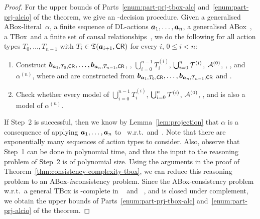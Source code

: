 \begin{proof}
        For the upper bounds of Parts~\ref{enum:part-prj-tbox-alc}
        and~\ref{enum:part-prj-alcio} of the theorem, we give an
        \ExpTime-decision procedure.  Given a generalised ABox-literal~$\alpha$,
        a finite sequence of DL-actions $\boldsymbol a_1,\dots,\boldsymbol a_n$, a generalised
        ABox~\Amc, a TBox~\Tmc and a finite set of causal relationships~\CR, we
        do the following for all action types $T_0,\dots,T_{n-1}$ with
        $T_i\in\mathfrak{T}(\boldsymbol a_{i+1},\mathsf{CR})$ for every $i$, $0\le i<n$:
        \begin{enumerate}
            \item Construct
                $\boldsymbol b_{\boldsymbol a_1,T_0,\mathsf{CR}},\dots,\boldsymbol b_{\boldsymbol a_n,T_{n-1},\mathsf{CR}}$, \Rmc,
                $\bigcup_{i=0}^{n-1}T_i^{(i)}$, $\bigcup_{i=0}^n\mathcal{T}^{(i)}$,
                $\mathcal{A}^{(0)}$, \Ared, \Tred, and $\alpha^{(n)}$, where \Ared and
                \Tred are constructed from
                $\boldsymbol b_{\boldsymbol a_1,T_0,\mathsf{CR}},\dots,\boldsymbol b_{\boldsymbol a_n,T_{n-1},\mathsf{CR}}$ and
                \Rmc.
            \item Check whether every model of $\bigcup_{i=0}^{n-1}T_i^{(i)}$,
                $\bigcup_{i=0}^n\mathcal{T}^{(i)}$, $\mathcal{A}^{(0)}$, \Ared, and \Tred is
                also a model of $\alpha^{(n)}$.
        \end{enumerate}
        If Step~2 is successful, then we know by Lemma~\ref{lem:projection} that
        $\alpha$ is a consequence of applying $\boldsymbol a_1,\dots,\boldsymbol a_n$ to~\Amc
        w.r.t.~\Tmc and~\CR.  Note that there are exponentially many sequences
        of action types to consider.  Also, observe that Step~1 can be done in
        polynomial time, and thus the input to the reasoning problem of Step~2
        is of polynomial size.  Using the arguments in the proof of
        Theorem~\ref{thm:consistency-complexity-tbox}, we can reduce this
        reasoning problem to an ABox-\emph{in}consistency problem.  Since the
        ABox-consistency problem w.r.t.\ a general TBox is \ExpTime-complete in
        \ALCIO~\cite{Sch-DKE94,Hla-DPIJCAR04} and
        \ALCQO~\cite{Sch-DKE94,HoSa-IJCAI01}, and \ExpTime is closed under
        complement, we obtain the upper bounds of
        Parts~\ref{enum:part-prj-tbox-alc} and~\ref{enum:part-prj-alcio} of the
        theorem.


\end{proof}

